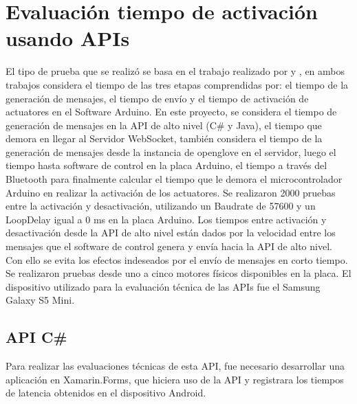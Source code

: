 \section{Evaluación tiempo de activación usando APIs}
El tipo de prueba que se realizó se basa en el trabajo realizado por  \cite{tesis-monsalve-rodrigo} y  \cite{tesis-meneses-sebastian}, en ambos trabajos considera el tiempo de las tres etapas comprendidas por: el tiempo de la generación de mensajes, el tiempo de envío y el tiempo de activación de actuatores en el Software Arduino. En este proyecto, se considera el tiempo de generación de mensajes en la API de alto nivel (C\# y Java), el tiempo que demora en llegar al Servidor WebSocket, también considera el tiempo de la generación de mensajes desde la instancia de openglove en el servidor, luego el tiempo hasta software de control en la placa Arduino, el tiempo a través del Bluetooth para finalmente calcular el tiempo que le demora el microcontrolador Arduino en realizar la activación de los actuatores. Se realizaron 2000 pruebas entre la activación y desactivación, utilizando un Baudrate de 57600 y un LoopDelay igual a 0 ms en la placa Arduino. Los tiempos entre activación y desactivación desde la API de alto nivel están dados por la velocidad entre los mensajes que el software de control genera y envía hacia la API de alto nivel. Con ello se evita los efectos indeseados por el envío de mensajes en corto tiempo. %
Se realizaron pruebas desde uno a cinco motores físicos disponibles en la placa. El dispositivo utilizado para la evaluación técnica de las APIs fue el Samsung Galaxy S5 Mini.
 
\subsection{API C\#}
Para realizar las evaluaciones técnicas de esta API, fue necesario desarrollar una aplicación en Xamarin.Forms, que hiciera uso de la API y registrara los tiempos de latencia obtenidos en el dispositivo Android.



